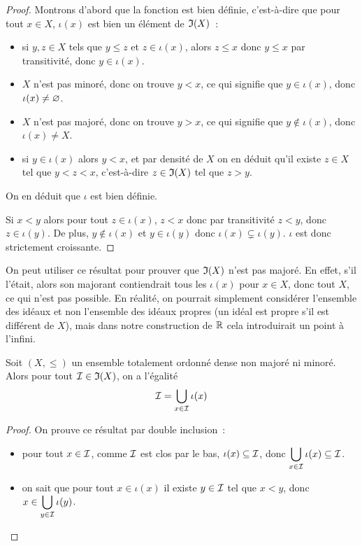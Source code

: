 \begin{proof}
  Montrons d'abord que la fonction est bien définie, c'est-à-dire que pour tout
  $x\in X$, $\iota(x)$ est bien un élément de $\mathfrak{I}(X)$~:
  \begin{itemize}
  \item si $y,z\in X$ tels que $y\leq z$ et $z\in \iota(x)$, alors $z \leq x$
    donc $y\leq x$ par transitivité, donc $y\in \iota(x)$.
  \item $X$ n'est pas minoré, donc on trouve $y < x$, ce qui signifie que
    $y \in \iota(x)$, donc $\iota(x) \neq\varnothing$.
  \item $X$ n'est pas majoré, donc on trouve $y > x$, ce qui signifie que
    $y\notin\iota(x)$, donc $\iota(x)\neq X$.
  \item si $y \in \iota(x)$ alors $y < x$, et par densité de $X$ on en déduit
    qu'il existe $z\in X$ tel que $y < z < x$, c'est-à-dire $z \in \mathfrak{I}(X)$
    tel que $z > y$.
  \end{itemize}
  On en déduit que $\iota$ est bien définie.

  Si $x < y$ alors pour tout $z \in \iota(x)$, $z < x$ donc par transitivité
  $z < y$, donc $z \in \iota(y)$. De plus, $y\notin\iota(x)$ et
  $y\in\iota(y)$ donc $\iota(x)\subsetneq\iota(y)$. $\iota$ est donc strictement
  croissante.
\end{proof}

\begin{remark}
  On peut utiliser ce résultat pour prouver que $\mathfrak{I}(X)$ n'est pas majoré.
  En effet, s'il l'était, alors son majorant contiendrait tous les $\iota(x)$
  pour $x\in X$, donc tout $X$, ce qui n'est pas possible. En réalité, on
  pourrait simplement considérer l'ensemble des idéaux et non l'ensemble des
  idéaux propres (un idéal est propre s'il est différent de $X$), mais dans
  notre construction de $\mathbb R$ cela introduirait un point à l'infini.
\end{remark}

\begin{lemma}\label{lem.id.cup}
  Soit $(X,\leq)$ un ensemble totalement ordonné dense non majoré ni minoré.
  Alors pour tout $\mathcal{I}\in\mathfrak{I}(X)$, on a l'égalité
  \[\mathcal{I} = \bigcup_{x\in \mathcal{I}} \iota(x)\]
\end{lemma}

\begin{proof}
  On prouve ce résultat par double inclusion~:
  \begin{itemize}
  \item pour tout $x\in \mathcal{I}$, comme $\mathcal{I}$ est clos par le bas,
    $\iota(x)\subseteq \mathcal{I}$, donc
    $\displaystyle\bigcup_{x\in \mathcal{I}}\iota(x)\subseteq \mathcal{I}$.
  \item on sait que pour tout $x\in \iota(x)$ il existe $y \in \mathcal{I}$ tel que
    $x < y$, donc $\displaystyle x\in \bigcup_{y\in \mathcal{I}} \iota(y)$.\qedhere
  \end{itemize}
\end{proof}

